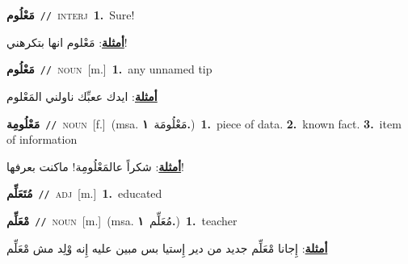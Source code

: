 \documentclass[10pt,a4paper,twoside]{article} %
\begin{document}
\begin{multicols}{2}
{\setlength\topsep{0pt}\textbf{\foreignlanguage{arabic}{مَعْلُوم}}\ {\color{gray}\texttt{//}\color{black}}\ \textsc{interj}\ \textbf{1.}~Sure!\  \begin{flushright}\color{gray}\foreignlanguage{arabic}{\textbf{\underline{\foreignlanguage{arabic}{أمثلة}}}: مَعْلوم انها بتكرهني!}\end{flushright}\color{black}} \vspace{2mm}

{\setlength\topsep{0pt}\textbf{\foreignlanguage{arabic}{مَعْلُوم}}\ {\color{gray}\texttt{//}\color{black}}\ \textsc{noun}\ [m.]\ \textbf{1.}~any unnamed tip\  \begin{flushright}\color{gray}\foreignlanguage{arabic}{\textbf{\underline{\foreignlanguage{arabic}{أمثلة}}}: ايدك ععبِّك ناولني المَعْلوم}\end{flushright}\color{black}} \vspace{2mm}

{\setlength\topsep{0pt}\textbf{\foreignlanguage{arabic}{مَعْلُومِة}}\ {\color{gray}\texttt{//}\color{black}}\ \textsc{noun}\ [f.]\ \color{gray}(msa. \foreignlanguage{arabic}{مَعْلُومَة}~\foreignlanguage{arabic}{\textbf{١.}})\color{black}\ \textbf{1.}~piece of data.  \textbf{2.}~known fact.  \textbf{3.}~item of information\  \begin{flushright}\color{gray}\foreignlanguage{arabic}{\textbf{\underline{\foreignlanguage{arabic}{أمثلة}}}: شكراً عالمَعْلُومِة! ماكنت بعرفها!}\end{flushright}\color{black}} \vspace{2mm}

{\setlength\topsep{0pt}\textbf{\foreignlanguage{arabic}{مُتَعَلِّم}}\ {\color{gray}\texttt{//}\color{black}}\ \textsc{adj}\ [m.]\ \textbf{1.}~educated\ } \vspace{2mm}

{\setlength\topsep{0pt}\textbf{\foreignlanguage{arabic}{مْعَلِّم}}\ {\color{gray}\texttt{//}\color{black}}\ \textsc{noun}\ [m.]\ \color{gray}(msa. \foreignlanguage{arabic}{مُعَلِّم}~\foreignlanguage{arabic}{\textbf{١.}})\color{black}\ \textbf{1.}~teacher\  \begin{flushright}\color{gray}\foreignlanguage{arabic}{\textbf{\underline{\foreignlanguage{arabic}{أمثلة}}}: إِجانا مْعَلِّم جديد من دير إِستيا بس مبين عليه إِنه وْلِد مش مْعَلِّم}\end{flushright}\color{black}} \vspace{2mm}


\end{multicols}
\end{document}
